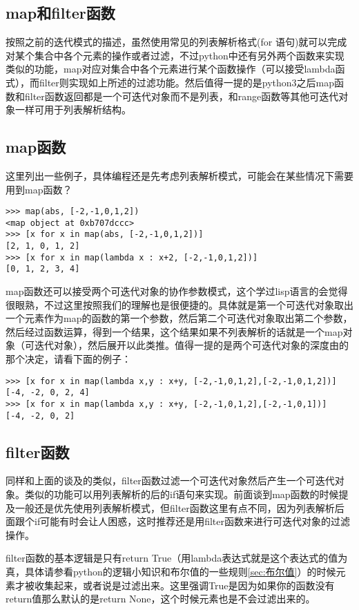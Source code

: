 \documentclass[12pt,oneside]{book}
\begin{document}
\begin{common-format}
\section{map和filter函数}
按照之前的迭代模式的描述，虽然使用常见的列表解析格式(for 语句)就可以完成对某个集合中各个元素的操作或者过滤，不过python中还有另外两个函数来实现类似的功能，map对应对集合中各个元素进行某个函数操作（可以接受lambda函式），而filter则实现如上所述的过滤功能。然后值得一提的是python3之后map函数和filter函数返回都是一个可迭代对象而不是列表，和range函数等其他可迭代对象一样可用于列表解析结构。

\subsection{map函数}
这里列出一些例子，具体编程还是先考虑列表解析模式，可能会在某些情况下需要用到map函数？

\begin{Verbatim}
>>> map(abs, [-2,-1,0,1,2])
<map object at 0xb707dccc>
>>> [x for x in map(abs, [-2,-1,0,1,2])]
[2, 1, 0, 1, 2]
>>> [x for x in map(lambda x : x+2, [-2,-1,0,1,2])]
[0, 1, 2, 3, 4]
\end{Verbatim}


map函数还可以接受两个可迭代对象的协作参数模式，这个学过lisp语言的会觉得很眼熟，不过这里按照我们的理解也是很便捷的。具体就是第一个可迭代对象取出一个元素作为map的函数的第一个参数，然后第二个可迭代对象取出第二个参数，然后经过函数运算，得到一个结果，这个结果如果不列表解析的话就是一个map对象（可迭代对象），然后展开以此类推。值得一提的是两个可迭代对象的深度由的那个决定，请看下面的例子：
\begin{Verbatim}
>>> [x for x in map(lambda x,y : x+y, [-2,-1,0,1,2],[-2,-1,0,1,2])]
[-4, -2, 0, 2, 4]
>>> [x for x in map(lambda x,y : x+y, [-2,-1,0,1,2],[-2,-1,0,1])]
[-4, -2, 0, 2]
\end{Verbatim}

\subsection{filter函数}
同样和上面的谈及的类似，filter函数过滤一个可迭代对象然后产生一个可迭代对象。类似的功能可以用列表解析的后的if语句来实现。前面谈到map函数的时候提及一般还是优先使用列表解析模式，但filter函数这里有点不同，因为列表解析后面跟个if可能有时会让人困惑，这时推荐还是用filter函数来进行可迭代对象的过滤操作。

filter函数的基本逻辑是只有return True（用lambda表达式就是这个表达式的值为真，具体请参看python的逻辑小知识和布尔值的一些规则\ref{sec:布尔值}）的时候元素才被收集起来，或者说是过滤出来。这里强调True是因为如果你的函数没有return值那么默认的是return None，这个时候元素也是不会过滤出来的。


\end{common-format}
\end{document}
